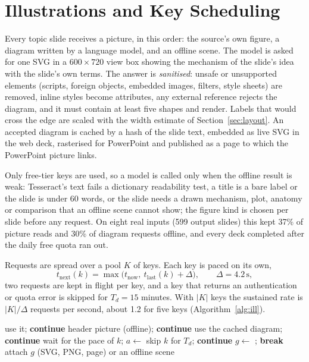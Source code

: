 \documentclass[conference]{IEEEtran}
\begin{document}
\section{Illustrations and Key Scheduling}
\label{sec:ill}
Every topic slide receives a picture, in this order: the source's own figure, a diagram written by a language model, and an
offline scene. The model is asked for one SVG in a $600\times720$ view box showing the mechanism of the slide's idea with the
slide's own terms. The answer is \emph{sanitised}: unsafe or unsupported elements (scripts, foreign objects, embedded images,
filters, style sheets) are removed, inline styles become attributes, any external reference rejects the diagram, and it must
contain at least five shapes and render. Labels that would cross the edge are scaled with the width estimate of
Section~\ref{sec:layout}. An accepted diagram is cached by a hash of the slide text, embedded as live SVG in the web deck,
rasterised for PowerPoint and published as a page to which the PowerPoint picture links.

Only free-tier keys are used, so a model is called only when the offline result is weak: Tesseract's text fails a dictionary
readability test, a title is a bare label or the slide is under 60 words, or the slide needs a drawn mechanism, plot, anatomy or
comparison that an offline scene cannot show; the figure kind is chosen per slide before any request. On eight real inputs
(599 output slides) this kept 37\% of picture reads and 30\% of diagram requests offline, and every deck completed after the
daily free quota ran out.

Requests are spread over a pool $K$ of keys. Each key is paced on its own,
\begin{equation}
t_{\mathrm{next}}(k)=\max\bigl(t_{\mathrm{now}},\ t_{\mathrm{last}}(k)+\Delta\bigr),\qquad \Delta=4.2\,\mathrm{s},
\end{equation}
two requests are kept in flight per key, and a key that returns an authentication or quota error is skipped for
$T_d=15$ minutes. With $|K|$ keys the sustained rate is $|K|/\Delta$ requests per second, about 1.2 for five keys
(Algorithm~\ref{alg:ill}).

\begin{algorithm}[H]
\caption{Illustration with fallbacks}
\label{alg:ill}
\begin{algorithmic}[1]
   \State use it; \textbf{continue} \EndIf
   \State header picture (offline); \textbf{continue} \EndIf
   \State use the cached diagram; \textbf{continue} \EndIf
    \State wait for the pace of $k$; $a\gets$ 
     \State skip $k$ for $T_d$; \textbf{continue} \EndIf
    \State $g\gets$ ; \textbf{break}
  \EndFor
  \State attach $g$ (SVG, PNG, page) or an offline scene
\EndFor
\end{algorithmic}
\end{algorithm}
\end{document}
